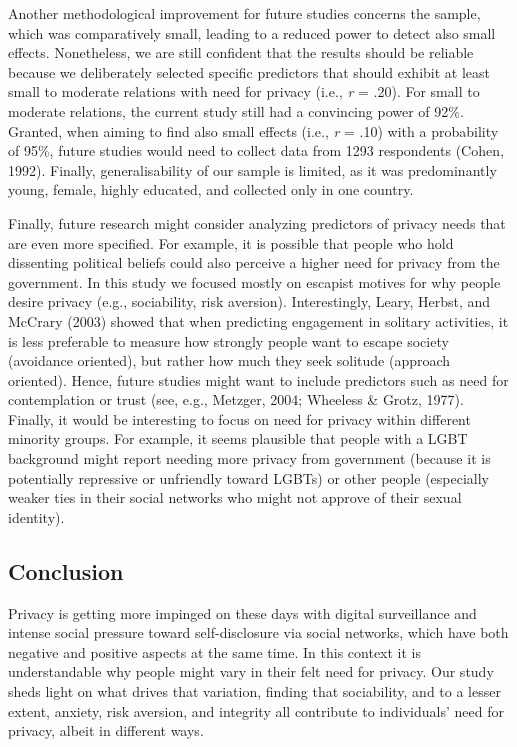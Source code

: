 \documentclass[man,floatsintext]{apa6}
\begin{document}
Another methodological improvement for future studies concerns the sample, which was comparatively small, leading to a reduced power to detect also small effects. Nonetheless, we are still confident that the results should be reliable because we deliberately selected specific predictors that should exhibit at least small to moderate relations with need for privacy (i.e., \emph{r} = .20). For small to moderate relations, the current study still had a convincing power of 92\%. Granted, when aiming to find also small effects (i.e., \emph{r} = .10) with a probability of 95\%, future studies would need to collect data from 1293 respondents (Cohen, 1992). Finally, generalisability of our sample is limited, as it was predominantly young, female, highly educated, and collected only in one country.

Finally, future research might consider analyzing predictors of privacy needs that are even more specified. For example, it is possible that people who hold dissenting political beliefs could also perceive a higher need for privacy from the government. In this study we focused mostly on escapist motives for why people desire privacy (e.g., sociability, risk aversion). Interestingly, Leary, Herbst, and McCrary (2003) showed that when predicting engagement in solitary activities, it is less preferable to measure how strongly people want to escape society (avoidance oriented), but rather how much they seek solitude (approach oriented). Hence, future studies might want to include predictors such as need for contemplation or trust (see, e.g., Metzger, 2004; Wheeless \& Grotz, 1977). Finally, it would be interesting to focus on need for privacy within different minority groups. For example, it seems plausible that people with a LGBT background might report needing more privacy from government (because it is potentially repressive or unfriendly toward LGBTs) or other people (especially weaker ties in their social networks who might not approve of their sexual identity).

\hypertarget{conclusion}{%
\subsection{Conclusion}\label{conclusion}}

Privacy is getting more impinged on these days with digital surveillance and intense social pressure toward self-disclosure via social networks, which have both negative and positive aspects at the same time. In this context it is understandable why people might vary in their felt need for privacy. Our study sheds light on what drives that variation, finding that sociability, and to a lesser extent, anxiety, risk aversion, and integrity all contribute to individuals' need for privacy, albeit in different ways.
\end{document}
